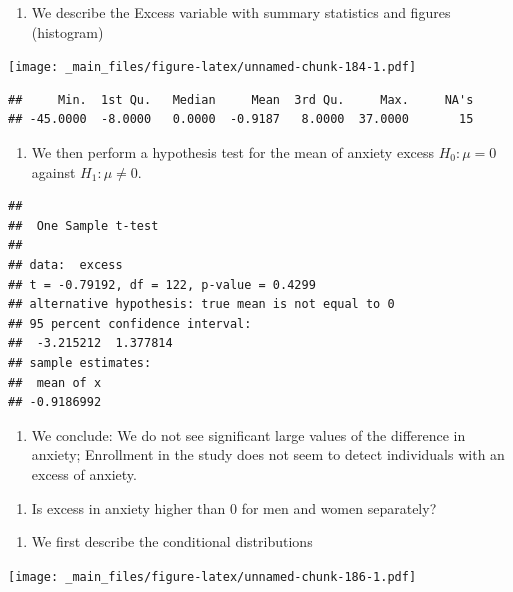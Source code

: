 \documentclass[
]{book}
\providecommand{\tightlist}{%
  \setlength{\itemsep}{0pt}\setlength{\parskip}{0pt}}
\begin{document}
\begin{enumerate}
\def\labelenumi{\alph{enumi}.}
\tightlist
\item
  We describe the Excess variable with summary statistics and figures (histogram)
\end{enumerate}

\texttt{[image: \_main\_files/figure-latex/unnamed-chunk-184-1.pdf]}

\begin{verbatim}
##     Min.  1st Qu.   Median     Mean  3rd Qu.     Max.     NA's 
## -45.0000  -8.0000   0.0000  -0.9187   8.0000  37.0000       15
\end{verbatim}

\begin{enumerate}
\def\labelenumi{\alph{enumi}.}
\setcounter{enumi}{1}
\tightlist
\item
  We then perform a hypothesis test for the mean of anxiety excess \(H_0:\mu=0\) against \(H_1:\mu \neq 0\).
\end{enumerate}

\begin{verbatim}
## 
##  One Sample t-test
## 
## data:  excess
## t = -0.79192, df = 122, p-value = 0.4299
## alternative hypothesis: true mean is not equal to 0
## 95 percent confidence interval:
##  -3.215212  1.377814
## sample estimates:
##  mean of x 
## -0.9186992
\end{verbatim}

\begin{enumerate}
\def\labelenumi{\alph{enumi}.}
\setcounter{enumi}{2}
\tightlist
\item
  We conclude: We do not see significant large values of the difference in anxiety; Enrollment in the study does not seem to detect individuals with an excess of anxiety.
\end{enumerate}

\begin{enumerate}
\def\labelenumi{\arabic{enumi}.}
\setcounter{enumi}{1}
\tightlist
\item
  Is excess in anxiety higher than \(0\) for men and women separately?
\end{enumerate}

\begin{enumerate}
\def\labelenumi{\alph{enumi}.}
\tightlist
\item
  We first describe the conditional distributions
\end{enumerate}

\texttt{[image: \_main\_files/figure-latex/unnamed-chunk-186-1.pdf]}
\end{document}
